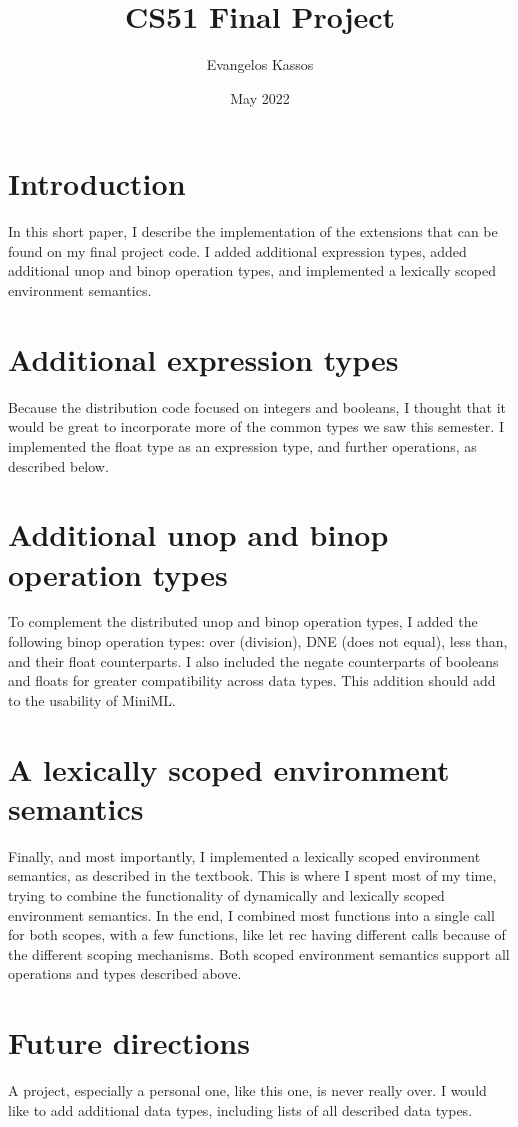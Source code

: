 \documentclass{article}
\title{CS51 Final Project}
\author{Evangelos Kassos}
\date{May 2022}
\begin{document}
\maketitle

\section{Introduction}
In this short paper, I describe the implementation of the extensions that can be found on my final project code. I added additional expression types, added additional unop and binop operation types, and implemented a lexically scoped environment semantics. 

\section{Additional expression types}
Because the distribution code focused on integers and booleans, I thought that it would be great to incorporate more of the common types we saw this semester. I implemented the float type as an expression type, and further operations, as described below.

\section{Additional unop and binop operation types}
To complement the distributed unop and binop operation types, I added the following binop operation types: over (division), DNE (does not equal), less than, and their float counterparts. I also included the negate counterparts of booleans and floats for greater compatibility across  data types. This addition should add to the usability of MiniML.

\section{A lexically scoped environment semantics}
Finally, and most importantly, I implemented a lexically scoped environment semantics, as described in the textbook. This is where I spent most of my time, trying to combine the functionality of dynamically and lexically scoped environment semantics. In the end, I combined most functions into a single call for both scopes, with a few functions, like let rec having different calls because of the different scoping mechanisms. Both scoped environment semantics support all operations and types described above.

\section{Future directions}
A project, especially a personal one, like this one, is never really over. I would like to add additional data types, including lists of all described data types. 
\end{document}
